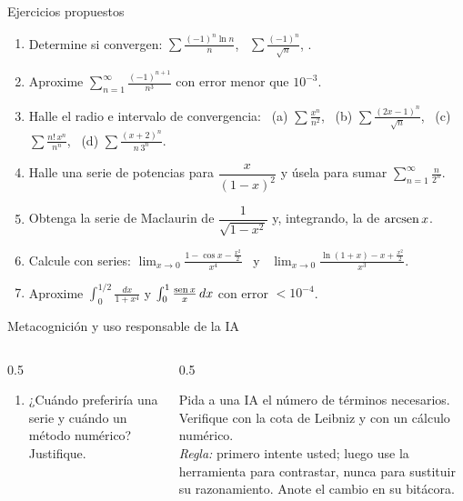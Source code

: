 \documentclass[10pt,aspectratio=169]{beamer}
\begin{document}
\begin{frame}{Ejercicios propuestos}
  \small
  \begin{ejercicio}
    \begin{enumerate}
      \item Determine si convergen: $\sum\frac{(-1)^n\ln n}{n}$, \ $\sum\frac{(-1)^n}{\sqrt n}$, .
      \item Aproxime $\sum_{n=1}^\infty\frac{(-1)^{n+1}}{n^3}$ con error menor que $10^{-3}$.
      \item Halle el radio e intervalo de convergencia: \ (a) $\sum\frac{x^n}{n^2}$, \ (b) $\sum\frac{(2x-1)^n}{\sqrt n}$,
        \ (c) $\sum\frac{n!\,x^n}{n^n}$, \ (d) $\sum\frac{(x+2)^n}{n\,3^n}$.
      \item Halle una serie de potencias para $\dfrac{x}{(1-x)^2}$ y úsela para sumar $\sum_{n=1}^\infty\frac{n}{2^n}$.
      \item Obtenga la serie de Maclaurin de $\dfrac1{\sqrt{1-x^2}}$ y, integrando, la de $\operatorname{arcsen} x$.
      \item Calcule con series: $\lim_{x\to0}\frac{1-\cos x-\frac{x^2}{2}}{x^4}$ \ y \ $\lim_{x\to0}\frac{\ln(1+x)-x+\frac{x^2}2}{x^3}$.
      \item Aproxime $\int_0^{1/2}\frac{dx}{1+x^4}$ y $\int_0^1\frac{\operatorname{sen} x}{x}\,dx$ con error $<10^{-4}$.
    \end{enumerate}
  \end{ejercicio}
\end{frame}

\begin{frame}{Metacognición y uso responsable de la IA}
  \small
  \begin{columns}[t]
    \begin{column}{0.5\textwidth}
      \begin{metacog}
        \begin{enumerate}
          \metacomun
          \item ¿Cuándo preferiría una serie y cuándo un método numérico? Justifique.
        \end{enumerate}
      \end{metacog}
    \end{column}
    \begin{column}{0.5\textwidth}
      \begin{iabox}
        Pida a una IA el número de términos necesarios. Verifique con la cota de Leibniz y con un cálculo numérico.\\[2pt]
        \textit{Regla:} primero intente usted; luego use la herramienta para contrastar, nunca para sustituir su razonamiento. Anote el cambio en su bitácora.
      \end{iabox}
    \end{column}
  \end{columns}
\end{frame}
\end{document}
